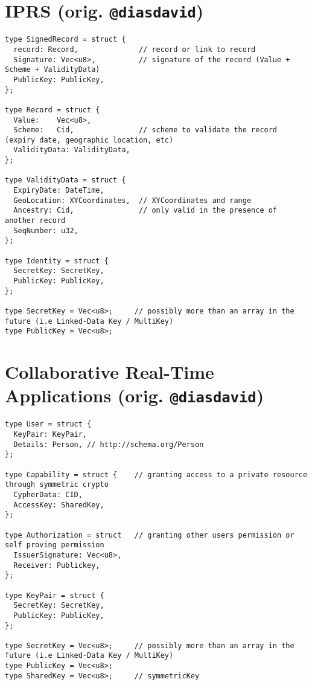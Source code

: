 \documentclass[11pt]{article}
\begin{document}
\newpage
\section{IPRS (orig. \texttt{@diasdavid})}

\begin{lstlisting}
type SignedRecord = struct {
  record: Record,              // record or link to record
  Signature: Vec<u8>,          // signature of the record (Value + Scheme + ValidityData)
  PublicKey: PublicKey,
};

type Record = struct {
  Value:    Vec<u8>,
  Scheme:   Cid,               // scheme to validate the record (expiry date, geographic location, etc)
  ValidityData: ValidityData,
};

type ValidityData = struct {
  ExpiryDate: DateTime,
  GeoLocation: XYCoordinates,  // XYCoordinates and range
  Ancestry: Cid,               // only valid in the presence of another record
  SeqNumber: u32,
};

type Identity = struct {
  SecretKey: SecretKey,
  PublicKey: PublicKey,
};

type SecretKey = Vec<u8>;     // possibly more than an array in the future (i.e Linked-Data Key / MultiKey)
type PublicKey = Vec<u8>;
\end{lstlisting}

\newpage
\section{Collaborative Real-Time Applications (orig. \texttt{@diasdavid})}

\begin{lstlisting}
type User = struct {
  KeyPair: KeyPair,
  Details: Person, // http://schema.org/Person
};

type Capability = struct {    // granting access to a private resource through symmetric crypto
  CypherData: CID,
  AccessKey: SharedKey,
};

type Authorization = struct   // granting other users permission or self proving permission
  IssuerSignature: Vec<u8>,
  Receiver: Publickey,
};

type KeyPair = struct {
  SecretKey: SecretKey,
  PublicKey: PublicKey,
};

type SecretKey = Vec<u8>;     // possibly more than an array in the future (i.e Linked-Data Key / MultiKey)
type PublicKey = Vec<u8>;
type SharedKey = Vec<u8>;     // symmetricKey
\end{lstlisting}
\end{document}
